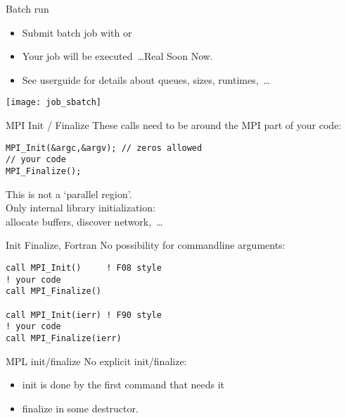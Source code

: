 \begin{numberedframe}{Batch run}
  \begin{itemize}
  \item Submit batch job with  or 
  \item Your job will be executed~\ldots Real Soon Now.
  \item See userguide for details about queues, sizes, runtimes,~\ldots
  \end{itemize}
  \texttt{[image: job\_sbatch]}
\end{numberedframe}


\begin{numberedframe}{MPI Init / Finalize}
 These calls need to be around the MPI part of your code:
\lstset{language=C}
\begin{lstlisting}
MPI_Init(&argc,&argv); // zeros allowed
// your code
MPI_Finalize();  
\end{lstlisting}
This is not a `parallel region'.\\
Only internal library initialization:\\
allocate buffers, discover network,~\ldots
\end{numberedframe}

\begin{fortran}
  \addtocounter{slidecount}{-1}
\begin{numberedframe}{Init Finalize, Fortran}
No possibility for commandline arguments:
\lstset{language=Fortran}
\begin{lstlisting}
call MPI_Init()     ! F08 style
! your code
call MPI_Finalize()

call MPI_Init(ierr) ! F90 style
! your code
call MPI_Finalize(ierr)
\end{lstlisting}  
\end{numberedframe}
\end{fortran}

\begin{mpl}
  \addtocounter{slidecount}{-1}
\begin{numberedframe}{MPL init/finalize}
    No explicit init/finalize:
    \begin{itemize}
    \item init is done by the first command that needs it
    \item finalize in some destructor.
    \end{itemize}
\end{numberedframe}
\end{mpl}

